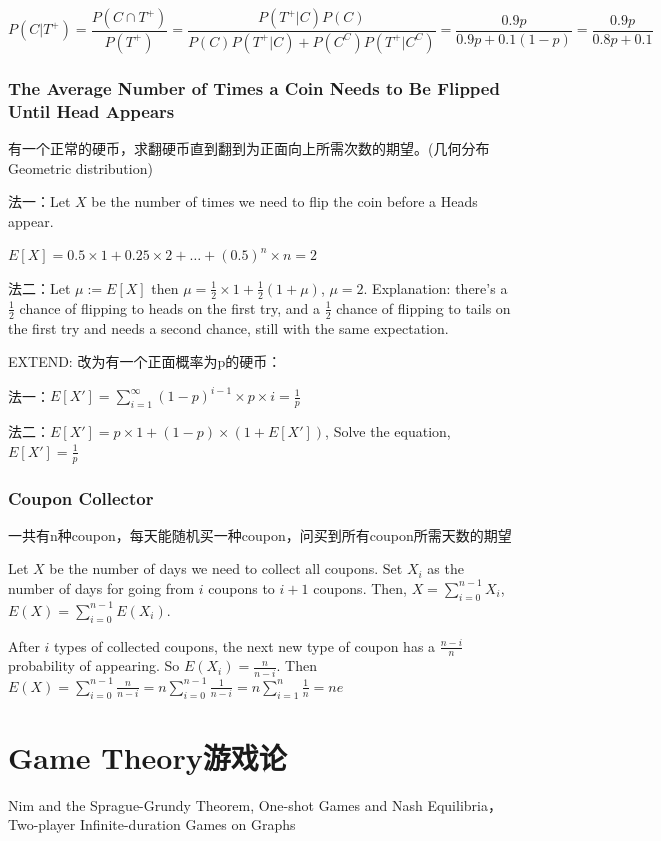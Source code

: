 \documentclass[12pt,a4paper]{ctexrep}
\begin{document}
\[P(C|T^+) = \frac{P(C\cap T^+)}{P(T^+)} = \frac{P(T^+|C)P(C)}{P(C)P(T^+|C)+P(C^C)P(T^+|C^C)} = \frac{0.9p}{0.9p+0.1(1-p)} = \frac{0.9p}{0.8p+0.1}\]

\subsection{The Average Number of Times a Coin Needs to Be Flipped Until Head Appears}
有一个正常的硬币，求翻硬币直到翻到为正面向上所需次数的期望。(几何分布Geometric distribution)

法一：Let $X$ be the number of times we need to flip the coin before a Heads appear.

$E[X] = 0.5\times 1 + 0.25\times 2 + \dots + (0.5)^n \times n = 2$

法二：Let $\mu := E[X]$ then $\mu = \frac{1}{2}\times 1 + \frac{1}{2}(1+\mu)$, $\mu = 2$. Explanation: there's a $\frac{1}{2}$ chance of flipping to heads on the first try, and a $\frac{1}{2}$ chance of flipping to tails on the first try and needs a second chance, still with the same expectation.

EXTEND: 改为有一个正面概率为p的硬币：

法一：$E[X'] = \sum_{i=1}^{\infty} (1-p)^{i-1} \times p \times i = \frac{1}{p}$

法二：$E[X'] = p \times 1 + (1-p) \times (1+E[X'])$, Solve the equation, $E[X'] = \frac{1}{p}$

\subsection{Coupon Collector}
一共有n种coupon，每天能随机买一种coupon，问买到所有coupon所需天数的期望

Let $X$ be the number of days we need to collect all coupons. Set $X_i$ as the number of days for going from $i$ coupons to $i+1$ coupons. Then, $X = \sum_{i=0}^{n-1} X_i$, $E(X) = \sum_{i=0}^{n-1} E(X_i)$.

After $i$ types of collected coupons, the next new type of coupon has a $\frac{n-i}{n}$ probability of appearing. So $E(X_i) = \frac{n}{n-i}$. Then $E(X) = \sum_{i=0}^{n-1} \frac{n}{n-i} = n \sum_{i=0}^{n-1}\frac{1}{n-i} = n \sum_{i=1}^{n} \frac{1}{n} = ne$

\chapter{Game Theory游戏论}
Nim and the Sprague-Grundy Theorem, One-shot Games and Nash Equilibria， Two-player Infinite-duration Games on Graphs
\end{document}
